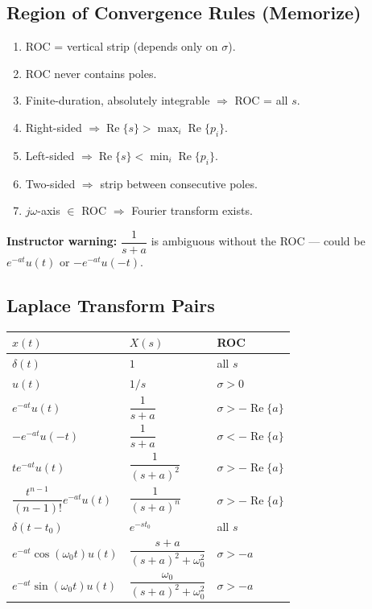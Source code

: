 \documentclass[11pt]{article}
\begin{document}
\subsection{Region of Convergence Rules (Memorize)}
\begin{enumerate}
  \item ROC = vertical strip (depends only on $\sigma$).
  \item ROC never contains poles.
  \item Finite-duration, absolutely integrable $\Rightarrow$ ROC = all $s$.
  \item Right-sided $\Rightarrow \operatorname{Re}\{s\} > \max_i \operatorname{Re}\{p_i\}$.
  \item Left-sided $\Rightarrow \operatorname{Re}\{s\} < \min_i \operatorname{Re}\{p_i\}$.
  \item Two-sided $\Rightarrow$ strip between consecutive poles.
  \item $j\omega$-axis $\in$ ROC $\Rightarrow$ Fourier transform exists.
\end{enumerate}

\noindent\textbf{Instructor warning:} $\dfrac{1}{s+a}$ is ambiguous without the ROC --- could be $e^{-at}u(t)$ or $-e^{-at}u(-t)$.

\subsection{Laplace Transform Pairs}
\begin{center}
\begin{tabular}{lll}
\toprule
$x(t)$ & $X(s)$ & ROC \\
\midrule
$\delta(t)$ & $1$ & all $s$ \\
$u(t)$ & $1/s$ & $\sigma > 0$ \\
$e^{-at}u(t)$ & $\dfrac{1}{s+a}$ & $\sigma > -\operatorname{Re}\{a\}$ \\
$-e^{-at}u(-t)$ & $\dfrac{1}{s+a}$ & $\sigma < -\operatorname{Re}\{a\}$ \\
$t e^{-at}u(t)$ & $\dfrac{1}{(s+a)^2}$ & $\sigma > -\operatorname{Re}\{a\}$ \\
$\dfrac{t^{n-1}}{(n-1)!}e^{-at}u(t)$ & $\dfrac{1}{(s+a)^n}$ & $\sigma > -\operatorname{Re}\{a\}$ \\
$\delta(t - t_0)$ & $e^{-s t_0}$ & all $s$ \\
$e^{-at}\cos(\omega_0 t)u(t)$ & $\dfrac{s+a}{(s+a)^2+\omega_0^2}$ & $\sigma > -a$ \\
$e^{-at}\sin(\omega_0 t)u(t)$ & $\dfrac{\omega_0}{(s+a)^2+\omega_0^2}$ & $\sigma > -a$ \\
\bottomrule
\end{tabular}
\end{center}
\end{document}
